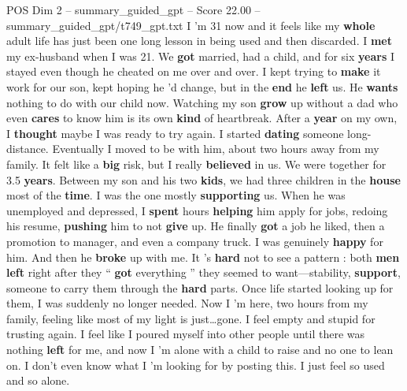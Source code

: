 \begin{textsample}{POS Dim 2 – summary\_guided\_gpt – Score 22.00 – summary\_guided\_gpt/t749\_gpt.txt}  \label{ex:f2_pos_016}
I ’m 31 now and it feels like my \textbf{whole} adult life has just been one long lesson in being used and then discarded.
I \textbf{met} my ex-husband when I was 21.
We \textbf{got} married, had a child, and for six \textbf{years} I stayed even though he cheated on me over and over.
I kept trying to \textbf{make} it work for our son, kept hoping he ’d change, but in the \textbf{end} he \textbf{left} us.
He \textbf{wants} nothing to do with our child now.
Watching my son \textbf{grow} up without a dad who even \textbf{cares} to know him is its own \textbf{kind} of heartbreak.
After a \textbf{year} on my own, I \textbf{thought} maybe I was ready to try again.
I started \textbf{dating} someone long-distance.
Eventually I moved to be with him, about two hours away from my family.
It felt like a \textbf{big} risk, but I really \textbf{believed} in us.
We were together for 3.5 \textbf{years}.
Between my son and his two \textbf{kids}, we had three children in the \textbf{house} most of the \textbf{time}.
I was the one mostly \textbf{supporting} us.
When he was unemployed and depressed, I \textbf{spent} hours \textbf{helping} him apply for jobs, redoing his resume, \textbf{pushing} him to not \textbf{give} up.
He finally \textbf{got} a job he liked, then a promotion to manager, and even a company truck.
I was genuinely \textbf{happy} for him.
And then he \textbf{broke} up with me.
It ’s \textbf{hard} not to see a pattern : both \textbf{men} \textbf{left} right after they “ \textbf{got} everything ” they seemed to want—stability, \textbf{support}, someone to carry them through the \textbf{hard} parts.
Once life started looking up for them, I was suddenly no longer needed.
Now I ’m here, two hours from my family, feeling like most of my light is just…gone.
I feel empty and stupid for trusting again.
I feel like I poured myself into other people until there was nothing \textbf{left} for me, and now I ’m alone with a child to raise and no one to lean on.
I don't even know what I ’m looking for by posting this.
I just feel so used and so alone.

\end{textsample}
